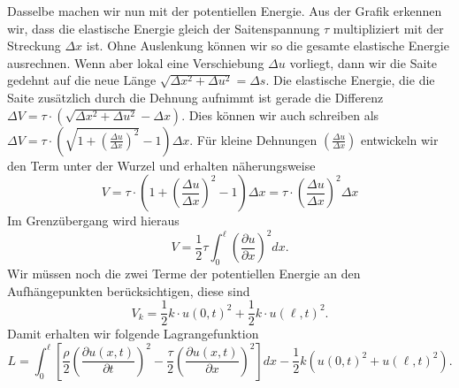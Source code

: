 Dasselbe machen wir nun mit der potentiellen Energie. Aus der Grafik erkennen
wir, dass die elastische Energie gleich der Saitenspannung $\tau$ multipliziert
mit der Streckung $\Delta x$ ist. Ohne Auslenkung können wir so die gesamte
elastische Energie ausrechnen. Wenn aber lokal eine Verschiebung $\Delta u$
vorliegt, dann wir die Saite gedehnt auf die neue Länge $\sqrt{\Delta x^2+\Delta
u^2}=\Delta s$. Die elastische Energie, die die Saite zusätzlich durch die
Dehnung aufnimmt ist gerade die Differenz $\Delta V=\tau\cdot(\sqrt{\Delta
x^2+\Delta u^2}-\Delta x)$. Dies können wir auch schreiben als $\Delta
V=\tau\cdot\left(\sqrt{1+\left(\frac{\Delta u}{\Delta
x}\right)^2}-1\right)\Delta x$. Für kleine Dehnungen $\left(\frac{\Delta u}{\Delta
x}\right)$ entwickeln wir den Term unter der Wurzel und erhalten näherungsweise
\[
  V=\tau\cdot\left(1+\left(\frac{\Delta u}{\Delta x}\right)^2-1\right)\Delta x
  =\tau\cdot\left(\frac{\Delta u}{\Delta x}\right)^2\Delta x
\]
Im Grenzübergang wird hieraus
\begin{equation}
  V=\frac{1}{2}\tau\int_0^\ell\left(\frac{\partial u}{\partial x}\right)^2dx.
  \label{eq:Epot}
\end{equation}
Wir müssen noch die zwei Terme der potentiellen Energie an den Aufhängepunkten
berücksichtigen, diese sind
\begin{equation}
  V_k=\frac{1}{2}k\cdot u(0,t)^2 +\frac{1}{2}k\cdot u(\ell,t)^2.
  \label{eq:EpotSprings}
\end{equation}
Damit erhalten wir folgende Lagrangefunktion
\begin{equation}
  L=\int_0^\ell\left[
    \frac{\rho}{2}\left(\frac{\partial u(x,t)}{\partial t}\right)^2
   -\frac{\tau}{2}\left(\frac{\partial u(x,t)}{\partial x}\right)^2
 \right]dx-\frac{1}{2}k\left(u(0,t)^2 + u(\ell,t)^2\right).
  \label{eq:LagrangianSaite}
\end{equation}

